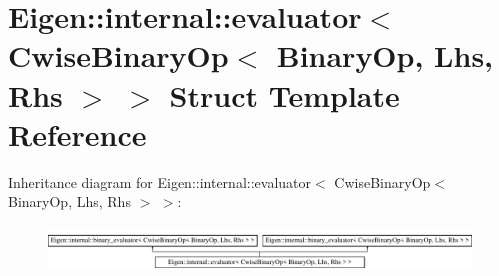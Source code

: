 \hypertarget{struct_eigen_1_1internal_1_1evaluator_3_01_cwise_binary_op_3_01_binary_op_00_01_lhs_00_01_rhs_01_4_01_4}{}\section{Eigen\+:\+:internal\+:\+:evaluator$<$ Cwise\+Binary\+Op$<$ Binary\+Op, Lhs, Rhs $>$ $>$ Struct Template Reference}
\label{struct_eigen_1_1internal_1_1evaluator_3_01_cwise_binary_op_3_01_binary_op_00_01_lhs_00_01_rhs_01_4_01_4}
Inheritance diagram for Eigen\+:\+:internal\+:\+:evaluator$<$ Cwise\+Binary\+Op$<$ Binary\+Op, Lhs, Rhs $>$ $>$\+:\begin{figure}[H]
\begin{center}
\leavevmode
\includegraphics[height=1.241685cm]{struct_eigen_1_1internal_1_1evaluator_3_01_cwise_binary_op_3_01_binary_op_00_01_lhs_00_01_rhs_01_4_01_4}
\end{center}
\end{figure}
